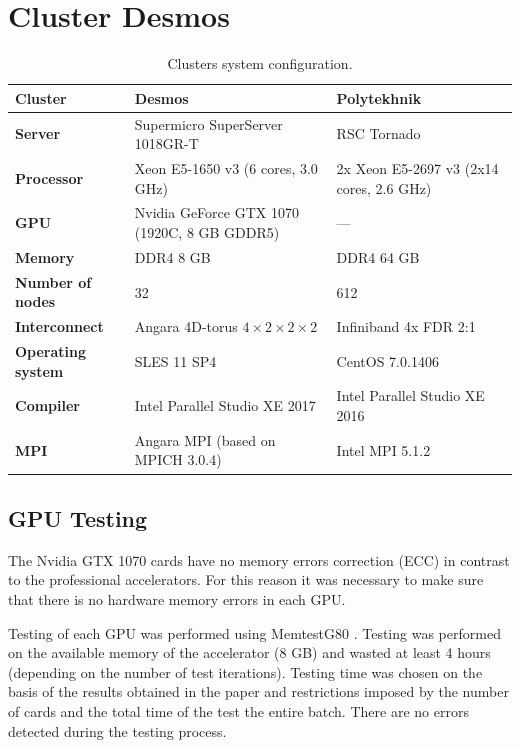 \documentclass{llncs}
\begin{document}
\section{Cluster Desmos}

\begin{table}[h]
\caption{\label{tab:systems}Clusters system configuration.}
\begin{center}
\renewcommand{\arraystretch}{1}
\begin{tabular}{|p{30mm}|p{45mm}|p{45mm}|}
\hline
\textbf{Cluster} & \textbf{Desmos} & \textbf{Polytekhnik} \\
\hline \hline
\textbf{Server} & Supermicro SuperServer 1018GR-T & RSC Tornado \\
\hline
\textbf{Processor} & Xeon E5-1650 v3 (6 cores, 3.0 GHz) & 2x Xeon E5-2697 v3 (2x14 cores, 2.6 GHz)\\
\hline
\textbf{GPU} & Nvidia GeForce GTX 1070 (1920C, 8 GB GDDR5) & --- \\
\hline
\textbf{Memory} & DDR4 8 GB & DDR4 64 GB\\
\hline
\textbf{Number of nodes} & 32 & 612 \\
\hline
\textbf{Interconnect} & Angara 4D-torus $4\times2\times2\times2$ & Infiniband 4x FDR 2:1\\
\hline
\textbf{Operating system} & SLES 11 SP4 & CentOS 7.0.1406 \\
\hline
\textbf{Compiler} & Intel Parallel Studio XE 2017 & Intel Parallel Studio XE 2016 \\
\hline
\textbf{MPI} & Angara MPI (based on MPICH 3.0.4) & Intel MPI 5.1.2 \\
\hline
\end{tabular}
\end{center}
\end{table}

\subsection{GPU Testing}
The Nvidia GTX 1070 cards have no memory errors correction
(ECC) in contrast to the professional accelerators. For this reason
it was necessary to make sure that there is no hardware memory errors in each GPU.


Testing of each GPU was performed using MemtestG80 \cite{Haque:2010:HDS:1844765.1845231}.
Testing was performed on the available memory of the accelerator (8 GB) and wasted at least
4 hours (depending on the number of test iterations). Testing time was chosen on the basis of the results obtained in the paper \cite{Kutzner2015BestBF} and restrictions 
imposed by the number of cards and the total time of the test the entire batch. There are no errors detected during the testing process.
\end{document}
